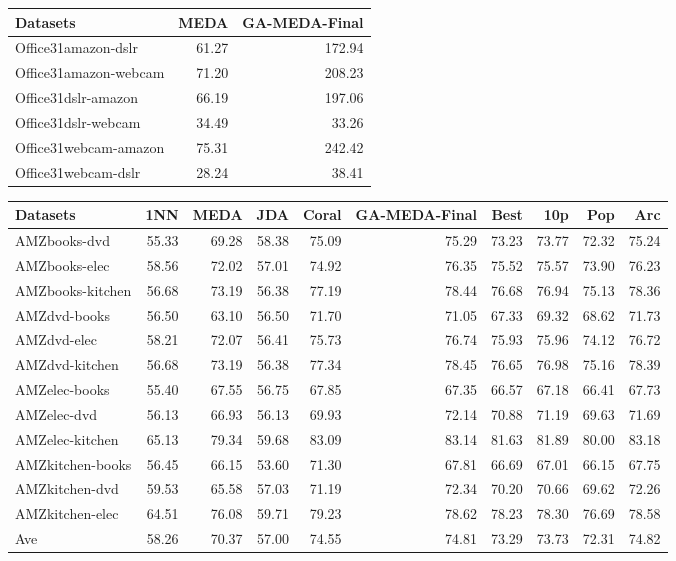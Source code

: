 \documentclass[a4paper]{article}
\begin{document}
\begin{tabular}{lrr}
	\toprule
	Datasets &   MEDA &  GA-MEDA-Final \\
	\midrule
	Office31amazon-dslr &  61.27 &         172.94 \\
	Office31amazon-webcam &  71.20 &         208.23 \\
	Office31dslr-amazon &  66.19 &         197.06 \\
	Office31dslr-webcam &  34.49 &          33.26 \\
	Office31webcam-amazon &  75.31 &         242.42 \\
	Office31webcam-dslr &  28.24 &          38.41 \\
	\bottomrule
\end{tabular}

\begin{tabular}{lrrrrrrrrr}
	\toprule
	Datasets &    1NN &   MEDA &    JDA &  Coral &  GA-MEDA-Final &   Best &    10p &    Pop &    Arc \\
	\midrule
	AMZbooks-dvd &  55.33 &  69.28 &  58.38 &  75.09 &          75.29 &  73.23 &  73.77 &  72.32 &  75.24 \\
	AMZbooks-elec &  58.56 &  72.02 &  57.01 &  74.92 &          76.35 &  75.52 &  75.57 &  73.90 &  76.23 \\
	AMZbooks-kitchen &  56.68 &  73.19 &  56.38 &  77.19 &          78.44 &  76.68 &  76.94 &  75.13 &  78.36 \\
	AMZdvd-books &  56.50 &  63.10 &  56.50 &  71.70 &          71.05 &  67.33 &  69.32 &  68.62 &  71.73 \\
	AMZdvd-elec &  58.21 &  72.07 &  56.41 &  75.73 &          76.74 &  75.93 &  75.96 &  74.12 &  76.72 \\
	AMZdvd-kitchen &  56.68 &  73.19 &  56.38 &  77.34 &          78.45 &  76.65 &  76.98 &  75.16 &  78.39 \\
	AMZelec-books &  55.40 &  67.55 &  56.75 &  67.85 &          67.35 &  66.57 &  67.18 &  66.41 &  67.73 \\
	AMZelec-dvd &  56.13 &  66.93 &  56.13 &  69.93 &          72.14 &  70.88 &  71.19 &  69.63 &  71.69 \\
	AMZelec-kitchen &  65.13 &  79.34 &  59.68 &  83.09 &          83.14 &  81.63 &  81.89 &  80.00 &  83.18 \\
	AMZkitchen-books &  56.45 &  66.15 &  53.60 &  71.30 &          67.81 &  66.69 &  67.01 &  66.15 &  67.75 \\
	AMZkitchen-dvd &  59.53 &  65.58 &  57.03 &  71.19 &          72.34 &  70.20 &  70.66 &  69.62 &  72.26 \\
	AMZkitchen-elec &  64.51 &  76.08 &  59.71 &  79.23 &          78.62 &  78.23 &  78.30 &  76.69 &  78.58 \\
	Ave &  58.26 &  70.37 &  57.00 &  74.55 &          74.81 &  73.29 &  73.73 &  72.31 &  74.82 \\
	\bottomrule
\end{tabular}
\end{document}
